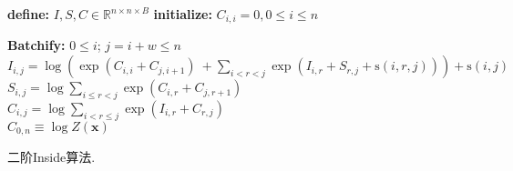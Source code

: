 \begin{algorithm}[tb]
    \begin{algorithmic}[1]
        \newlength{\commentindent}
        \setlength{\commentindent}{.3\textwidth}
        \renewcommand{\algorithmiccomment}[1]{\unskip\hfill\makebox[\commentindent][l]{$\rhd$~#1}\par}
        \LetLtxMacro{\oldalgorithmic}{\algorithmic}
        \renewcommand{\algorithmic}[1][0]{
            \oldalgorithmic[#1]
            \renewcommand{\ALC@com}[1]{
                \ifnum\pdfstrcmp{##1}{default}=0\else\algorithmiccomment{##1}\fi}%
        }
        \STATE \textbf{define:} $I,S,C \in \mathbb{R}^{n \times n \times B}$ 
        \STATE \textbf{initialize:} $C_{i, i}  = 0, 0 \le i \le n$

        \STATE \textbf{Batchify:} $0 \le i$; $j=i+w \le n$
        \STATE $I_{i, j} = \log\left(\exp\left(C_{i, i}  +  C_{j, i+1}\right) ~ +\sum\limits_{i < r < j} \exp\left(I_{i, r} + S_{r, j}+ \mathrm{s}(i, r, j)\right)\right) + \mathrm{s}(i, j)$
        \STATE $S_{i, j} = \log \sum\limits_{i \le r < j} \exp\left(C_{i, r}  +  C_{j, r+1}\right) $ \\
        \STATE $C_{i, j} = \log \sum\limits_{i < r \le j} \exp\left(I_{i, r}  +  C_{r, j}\right)  $ \\
        \ENDFOR {}
        \RETURN $C_{0, n} \equiv \log Z(\boldsymbol{x})$
    \end{algorithmic}
    \caption{二阶Inside算法.}
    \label{alg:eisner-2o}
\end{algorithm}
